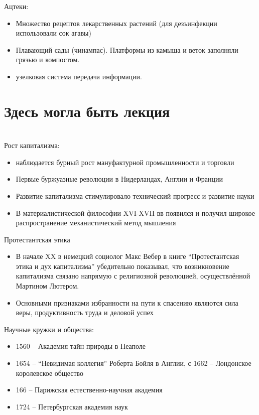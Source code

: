 \documentclass{book}
\theoremstyle{definition}
\begin{document}
    Ацтеки:
    \begin{itemize}
        \item Множество рецептов лекарственных растений (для дезъинфекции использовали сок агавы)
        \item Плавающий сады (чинампас). Платформы из камыша и веток заполняли грязью и компостом.
        \item узелковая система передача информации.
    \end{itemize}

    \section{Здесь могла быть лекция}

    \section{}

    Рост капитализма:
    \begin{itemize}
        \item  наблюдается бурный рост мануфактурной промышленности и торговли
        \item Первые буржуазные революции в Нидерландах, Англии и Франции
        \item Развитие капитализма стимулировало технический прогресс и развитие науки
        \item В материалистической философии XVI-XVII вв появился и получил широкое распространение механистический метод мышления
    \end{itemize}


    Протестантская этика
    \begin{itemize}
        \item  В начале XX в немецкий социолог Макс Вебер в книге ``Протестантская этика и дух капитализма'' убедительно показывал, что возникновение капитализма связано напрямую с религиозной революцией, осуществлённой Мартином Лютером.
        \item Основными признаками избранности на пути к спасению являются сила веры, продуктивность труда и деловой успех
    \end{itemize}

    Научные кружки и общества:
    \begin{itemize}
        \item  1560 -- Академия тайн природы в Неаполе
        \item 1654 -- ``Невидимая коллегия'' Роберта Бойля в Англии, с 1662 -- Лондонское королевское общество
        \item 166 -- Парижская естественно-научная академия
        \item 1724 -- Петербургская академия наук
    \end{itemize}
\end{document}
